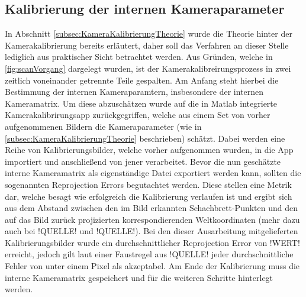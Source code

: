 \subsection{Kalibrierung der internen Kameraparameter}
In Abschnitt \ref{subsec:KameraKalibrierungTheorie} wurde die Theorie hinter der Kamerakalibrierung bereits erläutert, daher soll das Verfahren an dieser Stelle lediglich aus praktischer Sicht betrachtet werden. Aus Gründen, welche in \ref{fig:scanVorgang} dargelegt wurden, ist der Kamerakalibreirungsprozess in zwei zeitlich voneinander getrennte Teile gespalten. Am Anfang steht hierbei die Bestimmung der internen Kameraparamtern, insbesondere der internen Kameramatrix. Um diese abzuschätzen wurde auf die in Matlab integrierte Kamerakalibrirungsapp zurückgegriffen, welche aus einem Set von vorher aufgenommenen Bildern die Kameraparameter (wie in \ref{subsec:KameraKalibrierungTheorie} beschrieben) schätzt. Dabei werden eine Reihe von Kalibrierungsbilder, welche vorher aufgenommen wurden, in die App importiert und anschließend von jener verarbeitet. Bevor die nun geschätzte interne Kameramatrix als eigenständige Datei exportiert werden kann, sollten die sogenannten Reprojection Errors begutachtet werden. Diese stellen eine Metrik dar, welche besagt wie erfolgreich die Kalibrierung verlaufen ist und ergibt sich aus dem Abstand zwischen den im Bild erkannten Schachbrett-Punkten und den auf das Bild zurück projizierten korrespondierenden Weltkoordinaten (mehr dazu auch bei !QUELLE! und !QUELLE!). Bei den dieser Ausarbeitung mitgelieferten Kalibrierungsbilder wurde ein durchschnittlicher Reprojection Error von !WERT! erreicht, jedoch gilt laut einer Faustregel aus !QUELLE! jeder durchschnittliche Fehler von unter einem Pixel als akzeptabel. Am Ende der Kalibrierung muss die interne Kameramatrix gespeichert und für die weiteren Schritte hinterlegt werden.  

